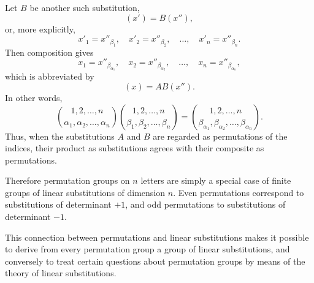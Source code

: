 \documentclass[11pt]{article}
\begin{document}
Let $B$ be another such substitution,
\begin{equation}\label{eq:weber8-perm-second}
(x')=B(x''),
\end{equation}
or, more explicitly,
\begin{equation}\label{eq:weber8-perm-second-coords}
x'_1=x''_{\beta_1},\quad x'_2=x''_{\beta_2},\quad\ldots,\quad x'_n=x''_{\beta_n}.
\end{equation}
Then composition gives
\begin{equation}\label{eq:weber8-perm-compose-coords}
x_1=x''_{\beta_{\alpha_1}},\quad x_2=x''_{\beta_{\alpha_2}},\quad\ldots,\quad x_n=x''_{\beta_{\alpha_n}},
\end{equation}
which is abbreviated by
\begin{equation}\label{eq:weber8-perm-compose}
(x)=AB(x'').
\end{equation}
In other words,
\begin{equation}\label{eq:weber8-perm-product}
\binom{1,2,\ldots,n}{\alpha_1,\alpha_2,\ldots,\alpha_n}
\binom{1,2,\ldots,n}{\beta_1,\beta_2,\ldots,\beta_n}
=
\binom{1,2,\ldots,n}{\beta_{\alpha_1},\beta_{\alpha_2},\ldots,\beta_{\alpha_n}}.
\end{equation}
Thus, when the substitutions $A$ and $B$ are regarded as permutations of the indices, their product as substitutions agrees with their composite as permutations.

Therefore permutation groups on $n$ letters are simply a special case of finite groups of linear substitutions of dimension $n$.  Even permutations correspond to substitutions of determinant $+1$, and odd permutations to substitutions of determinant $-1$.

This connection between permutations and linear substitutions makes it possible to derive from every permutation group a group of linear substitutions, and conversely to treat certain questions about permutation groups by means of the theory of linear substitutions.
\end{document}
